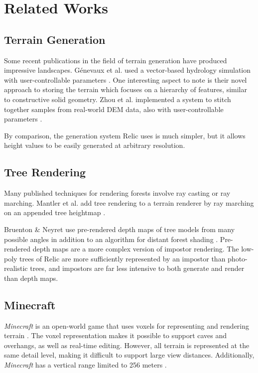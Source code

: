 
\chapter{Related Works} \label{rworks}

\section{Terrain Generation}

Some recent publications in the field of terrain generation have produced impressive landscapes.
G{\'e}nevaux et al. used a vector-based hydrology simulation with user-controllable parameters \cite{hydrology}.
One interesting aspect to note is their novel approach to storing the terrain which focuses on a hierarchy of features, similar to constructive solid geometry.
Zhou et al. implemented a system to stitch together samples from real-world DEM data, also with user-controllable parameters \cite{DEMsynthesis}.

By comparison, the generation system Relic uses is much simpler, but it allows height values to be easily generated at arbitrary resolution.

\section{Tree Rendering}

Many published techniques for rendering forests involve ray casting or ray marching.
Mantler et al. add tree rendering to a terrain renderer by ray marching on an appended tree heightmap \cite{terraintreecast}.

Bruenton \& Neyret use pre-rendered depth maps of tree models from many possible angles in addition to an algorithm for distant forest shading \cite{bruneton_trees}.
Pre-rendered depth maps are a more complex version of impostor rendering.
The low-poly trees of Relic are more sufficiently represented by an impostor than photo-realistic trees, and impostors are far less intensive to both generate and render than depth maps.

\section{Minecraft}

{\em Minecraft} is an open-world game that uses voxels for representing and rendering terrain \cite{word_of_notch}.
The voxel representation makes it possible to support caves and overhangs, as well as real-time editing.
However, all terrain is represented at the same detail level, making it difficult to support large view distances.
Additionally, {\em Minecraft} has a vertical range limited to 256 meters \cite{minecraft_altitude}.


